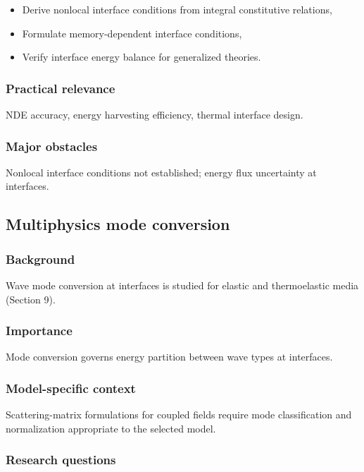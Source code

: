 \begin{itemize}
\item Derive nonlocal interface conditions from integral constitutive relations,
\item Formulate memory-dependent interface conditions,
\item Verify interface energy balance for generalized theories.
\end{itemize}

\subsubsection{Practical relevance}

NDE accuracy, energy harvesting efficiency, thermal interface design.

\subsubsection{Major obstacles}

Nonlocal interface conditions not established; energy flux uncertainty at interfaces.

\subsection{Multiphysics mode conversion}
\label{sec:multiphysics-mode-conversion}

\subsubsection{Background}

Wave mode conversion at interfaces is studied for elastic and thermoelastic media (Section 9).

\subsubsection{Importance}

Mode conversion governs energy partition between wave types at interfaces.

\subsubsection{Model-specific context}

Scattering-matrix formulations for coupled fields require mode classification and normalization appropriate to the selected model.

\subsubsection{Research questions}

